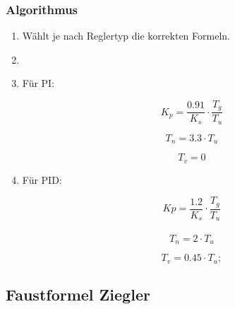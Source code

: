 \subsubsection*{Algorithmus}
\begin{enumerate}
    \item
        W\"ahlt je nach Reglertyp die korrekten Formeln.
    \item
    \item
        F\"ur PI:

        \begin{equation*}
            K_p= \frac{0.91}{K_s} \cdot \frac{T_g}{T_u}
        \end{equation*}

        \begin{equation*}
            T_n=3.3 \cdot T_u
        \end{equation*}

        \begin{equation*}
            T_v=0
        \end{equation*}
    \item
        F\"ur PID:

        \begin{equation*}
            Kp = \frac{1.2}{K_s} \cdot \frac{T_g}{T_u}
        \end{equation*}  \\

        \begin{equation*}
            T_n=2 \cdot T_u
        \end{equation*}

        \begin{equation*}
            T_v=0.45 \cdot T_u;
        \end{equation*}
\end{enumerate}

%


\clearpage
\subsection{Faustformel Ziegler}
\label{app:algo:ziegler}

